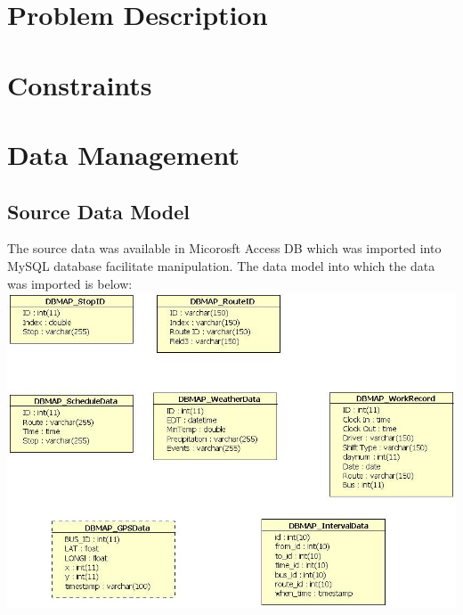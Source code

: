 \documentclass[12pt]{article}
\begin{document}
\clearpage

\section{Problem Description}
\section{Constraints}
\section{Data Management}
\subsection{Source Data Model}
The source data was available in Micorosft Access DB which was imported into MySQL database facilitate manipulation. The data model into which the data was imported is below:\\
\includegraphics[scale=0.5]{resources/dbmap_access}\\[1cm] 
\end{document}
